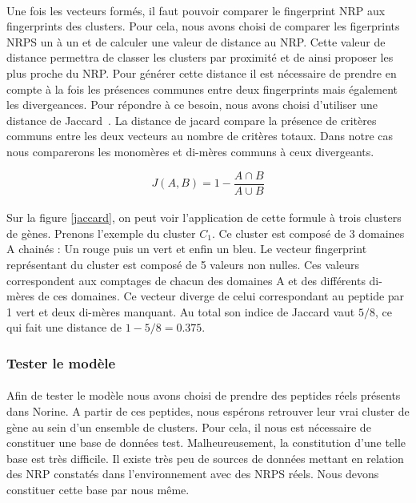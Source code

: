 \documentclass[12pt,french,twoside]{report}
\begin{document}
\paragraph{}Une fois les vecteurs formés, il faut pouvoir comparer le fingerprint NRP aux fingerprints des clusters.
Pour cela, nous avons choisi de comparer les figerprints NRPS un à un et de calculer une valeur de distance au NRP.
Cette valeur de distance permettra de classer les clusters par proximité et de ainsi proposer les plus proche du NRP.
Pour générer cette distance il est nécessaire de prendre en compte à la fois les présences communes entre deux fingerprints mais également les divergeances.
Pour répondre à ce besoin, nous avons choisi d'utiliser une distance de Jaccard~\cite{jaccard_etude_1901}.
La distance de jacard compare la présence de critères communs entre les deux vecteurs au nombre de critères totaux.
Dans notre cas nous comparerons les monomères et di-mères communs à ceux divergeants.

\begin{equation}
  J(A,B) = 1 - \frac{A \cap B}{A \cup B}
\end{equation}

\paragraph{}Sur la figure \ref{jaccard}, on peut voir l'application de cette formule à trois clusters de gènes.
Prenons l'exemple du cluster $C_1$.
Ce cluster est composé de 3 domaines A chainés : Un rouge puis un vert et enfin un bleu.
Le vecteur fingerprint représentant du cluster est composé de 5 valeurs non nulles.
Ces valeurs correspondent aux comptages de chacun des domaines A et des différents di-mères de ces domaines.
Ce vecteur diverge de celui correspondant au peptide par 1 vert et deux di-mères manquant.
Au total son indice de Jaccard vaut $5 / 8$, ce qui fait une distance de $1 - 5/8 = 0.375$.





\subsubsection{Tester le modèle}

\paragraph{}Afin de tester le modèle nous avons choisi de prendre des peptides réels présents dans Norine.
A partir de ces peptides, nous espérons retrouver leur vrai cluster de gène au sein d'un ensemble de clusters.
Pour cela, il nous est nécessaire de constituer une base de données test.
Malheureusement, la constitution d'une telle base est très difficile.
Il existe très peu de sources de données mettant en relation des NRP constatés dans l'environnement avec des NRPS réels.
Nous devons constituer cette base par nous même.
\end{document}

